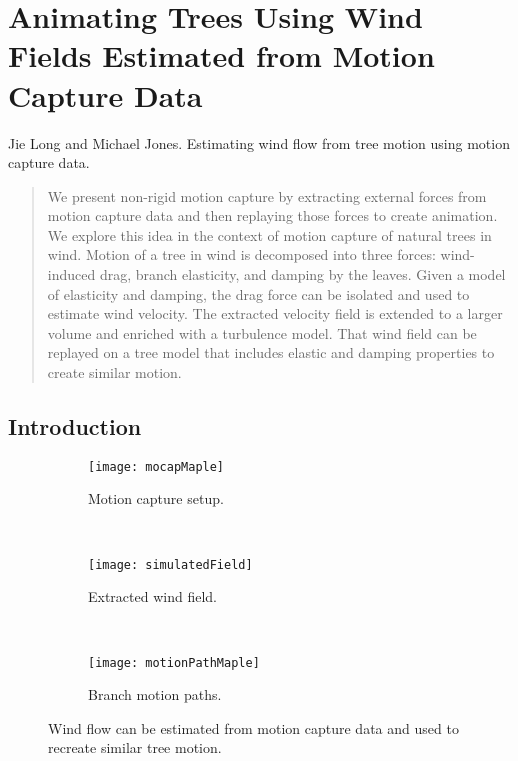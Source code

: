 \chapter{Animating Trees Using Wind Fields Estimated from Motion Capture Data} 
\label{chap:estwindfield}

\noindent
Jie Long and Michael Jones. Estimating wind flow from tree motion using motion capture data.

\begin{abstract}
We present non-rigid motion capture by extracting external forces from motion capture data and then replaying those forces to create animation. We explore this idea in the context of motion capture of natural trees in wind.  Motion of a tree in wind is decomposed into three forces: wind-induced drag, branch elasticity, and damping by the leaves.  Given a model of elasticity and damping, the drag force can be isolated and used to estimate wind velocity.  The extracted velocity field is extended to a larger volume and enriched with a turbulence model.  That wind field can be replayed on a tree model that includes elastic and damping properties to create similar motion. 
\end{abstract}

\section{Introduction}

\begin{figure}
\centering
        \begin{subfigure}[b]{0.30\textwidth}
                \centering
                \texttt{[image: mocapMaple]}
                \caption{Motion capture setup.}
                \label{fig:subfig1}
        \end{subfigure}%
        ~
        \begin{subfigure}[b]{0.3\textwidth}
                \centering
                \texttt{[image: simulatedField]}
                \caption{Extracted wind field.}
                \label{fig:subfig2}
        \end{subfigure}
        ~
        \begin{subfigure}[b]{0.3\textwidth}
                \centering
                \texttt{[image: motionPathMaple]}
                \caption{Branch motion paths.}
                \label{fig:subfig3}
        \end{subfigure}        
        \caption[Estimate wind flow and create tree motion. ]{Wind flow can be estimated from motion capture data and used to recreate similar tree motion.}
        \label{fig:title}
\end{figure}

